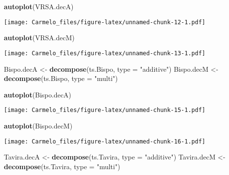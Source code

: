 \documentclass[
  14pt,
]{article}
\newenvironment{Shaded}{\begin{snugshade}}{\end{snugshade}}
\newcommand{\AttributeTok}[1]{\textcolor[rgb]{0.13,0.29,0.53}{#1}}
\newcommand{\FunctionTok}[1]{\textcolor[rgb]{0.13,0.29,0.53}{\textbf{#1}}}
\newcommand{\NormalTok}[1]{#1}
\newcommand{\OtherTok}[1]{\textcolor[rgb]{0.56,0.35,0.01}{#1}}
\newcommand{\StringTok}[1]{\textcolor[rgb]{0.31,0.60,0.02}{#1}}
\begin{document}
\begin{Shaded}
\begin{Highlighting}[]
\FunctionTok{autoplot}\NormalTok{(VRSA.decA)}
\end{Highlighting}
\end{Shaded}

\texttt{[image: Carmelo\_files/figure-latex/unnamed-chunk-12-1.pdf]}

\begin{Shaded}
\begin{Highlighting}[]
\FunctionTok{autoplot}\NormalTok{(VRSA.decM)}
\end{Highlighting}
\end{Shaded}

\texttt{[image: Carmelo\_files/figure-latex/unnamed-chunk-13-1.pdf]}

\begin{Shaded}
\begin{Highlighting}[]
\NormalTok{Bispo.decA }\OtherTok{\textless{}{-}} \FunctionTok{decompose}\NormalTok{(ts.Bispo, }\AttributeTok{type =} \StringTok{"additive"}\NormalTok{)}
\NormalTok{Bispo.decM }\OtherTok{\textless{}{-}} \FunctionTok{decompose}\NormalTok{(ts.Bispo, }\AttributeTok{type =} \StringTok{"multi"}\NormalTok{)}
\end{Highlighting}
\end{Shaded}

\begin{Shaded}
\begin{Highlighting}[]
\FunctionTok{autoplot}\NormalTok{(Bispo.decA)}
\end{Highlighting}
\end{Shaded}

\texttt{[image: Carmelo\_files/figure-latex/unnamed-chunk-15-1.pdf]}

\begin{Shaded}
\begin{Highlighting}[]
\FunctionTok{autoplot}\NormalTok{(Bispo.decM)}
\end{Highlighting}
\end{Shaded}

\texttt{[image: Carmelo\_files/figure-latex/unnamed-chunk-16-1.pdf]}

\begin{Shaded}
\begin{Highlighting}[]
\NormalTok{Tavira.decA }\OtherTok{\textless{}{-}} \FunctionTok{decompose}\NormalTok{(ts.Tavira, }\AttributeTok{type =} \StringTok{"additive"}\NormalTok{)}
\NormalTok{Tavira.decM }\OtherTok{\textless{}{-}} \FunctionTok{decompose}\NormalTok{(ts.Tavira, }\AttributeTok{type =} \StringTok{"multi"}\NormalTok{)}
\end{Highlighting}
\end{Shaded}
\end{document}
